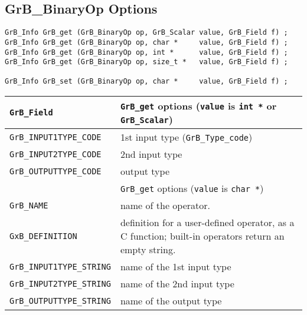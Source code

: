 \newpage
\subsection{{\sf GrB\_BinaryOp} Options}
\label{get_set_binop}

\begin{mdframed}[userdefinedwidth=6in]
{\footnotesize
\begin{verbatim}
GrB_Info GrB_get (GrB_BinaryOp op, GrB_Scalar value, GrB_Field f) ;
GrB_Info GrB_get (GrB_BinaryOp op, char *     value, GrB_Field f) ;
GrB_Info GrB_get (GrB_BinaryOp op, int *      value, GrB_Field f) ;
GrB_Info GrB_get (GrB_BinaryOp op, size_t *   value, GrB_Field f) ;

GrB_Info GrB_set (GrB_BinaryOp op, char *     value, GrB_Field f) ;
\end{verbatim}
}\end{mdframed}

\noindent
{\small
\begin{tabular}{p{2.2in}p{3.5in}}
\hline
\hline
\verb'GrB_Field'                    & \verb'GrB_get' options (\verb'value' is \verb'int *' or \verb'GrB_Scalar') \\
\hline
\verb'GrB_INPUT1TYPE_CODE'          & 1st input type (\verb'GrB_Type_code') \\
\verb'GrB_INPUT2TYPE_CODE'          & 2nd input type \\
\verb'GrB_OUTPUTTYPE_CODE'          & output type \\
\hline
\hline
                                    & \verb'GrB_get' options (\verb'value' is \verb'char *') \\
\hline
\verb'GrB_NAME'                     & name of the operator. \\
\verb'GxB_DEFINITION'               & definition for a user-defined operator, as a C function; built-in operators
                                        return an empty string. \\
\verb'GrB_INPUT1TYPE_STRING'        & name of the 1st input type \\
\verb'GrB_INPUT2TYPE_STRING'        & name of the 2nd input type \\
\verb'GrB_OUTPUTTYPE_STRING'        & name of the output type \\
\hline
\end{tabular}
}

